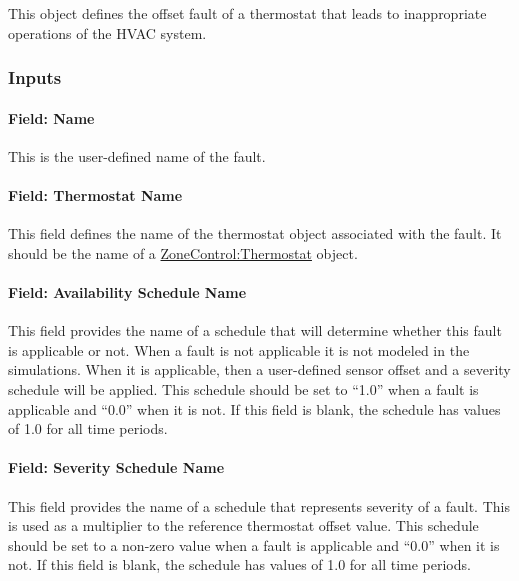 This object defines the offset fault of a thermostat that leads to inappropriate operations of the HVAC system.

\subsubsection{Inputs}\label{inputs-6-015}

\paragraph{Field: Name}\label{field-name-6-012}

This is the user-defined name of the fault.

\paragraph{Field: Thermostat Name}\label{field-thermostat-name}

This field defines the name of the thermostat object associated with the fault. It should be the name of a \hyperref[zonecontrolthermostat]{ZoneControl:Thermostat} object.

\paragraph{Field: Availability Schedule Name}\label{field-availability-schedule-name-6-002}

This field provides the name of a schedule that will determine whether this fault is applicable or not. When a fault is not applicable it is not modeled in the simulations. When it is applicable, then a user-defined sensor offset and a severity schedule will be applied. This schedule should be set to ``1.0'' when a fault is applicable and ``0.0'' when it is not. If this field is blank, the schedule has values of 1.0 for all time periods.

\paragraph{Field: Severity Schedule Name}\label{field-severity-schedule-name-6}

This field provides the name of a schedule that represents severity of a fault. This is used as a multiplier to the reference thermostat offset value. This schedule should be set to a non-zero value when a fault is applicable and ``0.0'' when it is not. If this field is blank, the schedule has values of 1.0 for all time periods.

